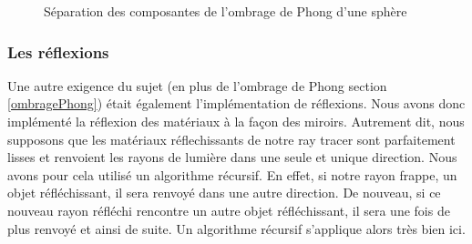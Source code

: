 \documentclass[11pt]{article}
\begin{document}
\begin{figure}[h!]

	\caption{Séparation des composantes de l'ombrage de Phong d'une sphère}
	\label{finalPhong}
\end{figure}
\FloatBarrier

\subsubsection{Les réflexions}
Une autre exigence du sujet (en plus de l'ombrage de Phong section \ref{ombragePhong}) était également l'implémentation de réflexions. Nous avons donc implémenté la réflexion des matériaux à la façon des miroirs. Autrement dit, nous supposons que les matériaux réflechissants de notre ray tracer sont parfaitement lisses et renvoient les rayons de lumière dans une seule et unique direction. Nous avons pour cela utilisé un algorithme récursif. En effet, si notre rayon frappe, un objet réfléchissant, il sera renvoyé dans une autre direction. De nouveau, si ce nouveau rayon réfléchi rencontre un autre objet réfléchissant, il sera une fois de plus renvoyé et ainsi de suite. Un algorithme récursif s'applique alors très bien ici.
\end{document}
